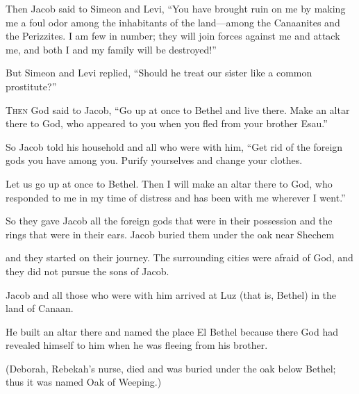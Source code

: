 \begin{scripture}
 Then Jacob said to Simeon and Levi, ``You have brought ruin on me by making me a foul odor among the inhabitants of the land---among the Canaanites and the Perizzites. I am few in number; they will join forces against me and attack me, and both I and my family will be destroyed!''
 But Simeon and Levi replied, ``Should he treat our sister like a common prostitute?''

 \allowchapbreak\hypertarget{ch-genesis-35}{}\lettrine[lines=5]{\color{pentateuch}T}{\textsc{hen}} God said to Jacob, ``Go up at once to Bethel and live there. Make an altar there to God, who appeared to you when you fled from your brother Esau.''\everypar{}
 So Jacob told his household and all who were with him, ``Get rid of the foreign gods you have among you. Purify yourselves and change your clothes.
 Let us go up at once to Bethel. Then I will make an altar there to God, who responded to me in my time of distress and has been with me wherever I went.''
\everypar{}

 So they gave Jacob all the foreign gods that were in their possession and the rings that were in their ears. Jacob buried them under the oak near Shechem
 and they started on their journey. The surrounding cities were afraid of God, and they did not pursue the sons of Jacob.
\everypar{}

 Jacob and all those who were with him arrived at Luz (that is, Bethel) in the land of Canaan.
 He built an altar there and named the place El Bethel because there God had revealed himself to him when he was fleeing from his brother.
 (Deborah, Rebekah's nurse, died and was buried under the oak below Bethel; thus it was named Oak of Weeping.)
\everypar{}


\end{scripture}
